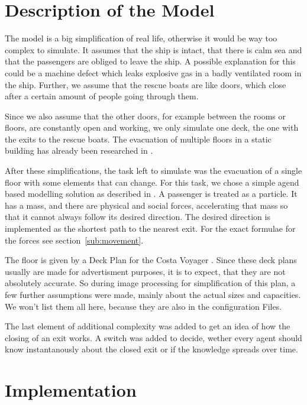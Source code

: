 \documentclass[11pt]{article}
\begin{document}
\section{Description of the Model}

The model is a big simplification of real life, otherwise it would be way too
complex to simulate.  It assumes that the ship is intact, that there is calm
sea and that the passengers are obliged to leave the ship.  A possible
explanation for this could be a machine defect which leaks explosive gas in a
badly ventilated room in the ship.  Further, we assume that the rescue boats are
like doors, which close after a certain amount of people going through them. 

Since we also assume that the other doors, for example between the rooms or
floors, are constantly open and working, we only simulate one deck, the one
with the exits to the rescue boats.  The evacuation of multiple floors in a
static building has already been researched in \cite{multilevel}. 

After these simplifications, the task left to simulate was the evacuation of a
single floor with some elements that can change.  For this task, we chose a
simple agend based modelling solution as described in \cite{helbing}.  A
passenger is treated as a particle.  It has a mass, and there are physical and
social forces, accelerating that mass so that it cannot always follow its
desired direction.  The desired direction is implemented as the shortest path
to the nearest exit.  For the exact formulae for the forces see
section~\ref{sub:movement}.

The floor is given by a Deck Plan for the Costa Voyager \cite{costa}. Since these deck plans usually are made for advertisment purposes, it is to expect, that they are not absolutely accurate.
So during image processing for simplification of this plan, a few further assumptions were made, mainly about the actual sizes and capacities. 
We won't list them all here, because they are also in the configuration Files. 

The last element of additional complexity was added to get an idea of how the closing of an exit works. 
A switch was added to decide, wether every agent should know instantanously about the closed exit or if the knowledge spreads over time.

\section{Implementation}
\end{document}
